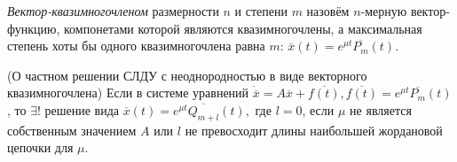 \Def \textit{Вектор-квазимногочленом} размерности $n$ и степени $m$ назовём $n$-мерную вектор-функцию, компонетами которой являются квазимногочлены, а максимальная степень хоты бы одного квазимногочлена равна $m$: $\overline{x}(t) = e^{\mu t} \overline{P_{m}}(t)$.

\Th (О частном решении СЛДУ с неоднородностью в виде векторного квазимногочлена)
Если в системе уравнений $\dot{\overline{x}} = A \overline{x} + \overline{f(t)}, \overline{f(t)} = e^{\mu t} \overline{P_{m}}(t)$, то $\exists !$ решение вида $\overline{x}(t) = e^{\mu t} \overline{Q_{m+l}}(t),$ где $l =0$, если $\mu$ не является собственным значением $A$ или $l$ не превосходит длины наибольшей жордановой цепочки для $\mu$.



